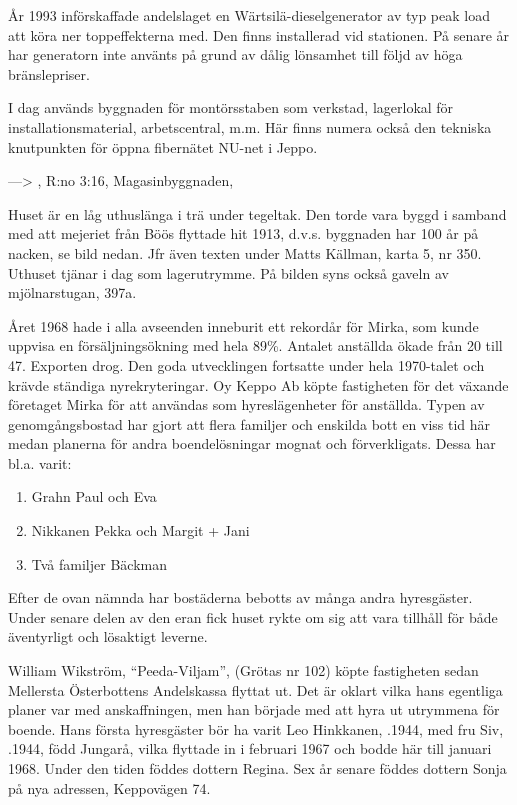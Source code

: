 År 1993 införskaffade andelslaget en Wärtsilä-dieselgenerator av typ peak load att köra ner toppeffekterna med. Den finns installerad vid 	stationen. På senare år har generatorn inte använts på grund av dålig lönsamhet till följd av höga bränslepriser.

I dag används byggnaden för montörsstaben som verkstad, lagerlokal för installationsmaterial, arbetscentral, m.m. Här finns numera också den tekniska knutpunkten för öppna fibernätet NU-net i Jeppo.


---> , R:no 3:16, 	Magasinbyggnaden, 

Huset är en låg uthuslänga i trä under tegeltak. Den torde vara byggd i samband med att mejeriet från Böös flyttade hit 1913, d.v.s. byggnaden har 100 år på nacken, se bild nedan. Jfr även texten under Matts Källman, karta 5, nr 350. Uthuset tjänar i dag som lagerutrymme. På bilden syns också gaveln av mjölnarstugan, 397a.



%
Året 1968 hade i alla avseenden inneburit ett rekordår för Mirka, som kunde uppvisa en försäljningsökning med hela 89\%. Antalet anställda ökade från 20 till 47. Exporten drog. Den goda utvecklingen fortsatte under hela 1970-talet och krävde ständiga nyrekryteringar. Oy Keppo Ab köpte fastigheten för det växande företaget Mirka för att användas som hyreslägenheter för anställda. Typen av genomgångsbostad har gjort att flera familjer och enskilda bott en viss tid här medan planerna för andra boendelösningar mognat och förverkligats. Dessa har bl.a. varit:
\begin{enumerate}
  \item Grahn Paul och Eva
  \item Nikkanen Pekka och Margit + Jani
  \item Två familjer Bäckman
\end{enumerate}
Efter de ovan nämnda har bostäderna bebotts av många andra hyresgäster. Under senare delen av den eran fick huset rykte om sig att vara tillhåll för både äventyrligt och lösaktigt leverne.


%
William Wikström, ``Peeda-Viljam'', (Grötas nr 102) köpte fastigheten sedan Mellersta Österbottens Andelskassa flyttat ut. Det är oklart vilka hans egentliga planer var med anskaffningen, men han började med att hyra ut utrymmena för boende. Hans första hyresgäster bör ha varit Leo Hinkkanen, .1944, med fru Siv, .1944, född Jungarå, vilka flyttade in i februari 1967 och bodde här till januari 1968. Under den tiden föddes dottern Regina. Sex år senare föddes dottern Sonja på nya adressen, Keppovägen 74.

